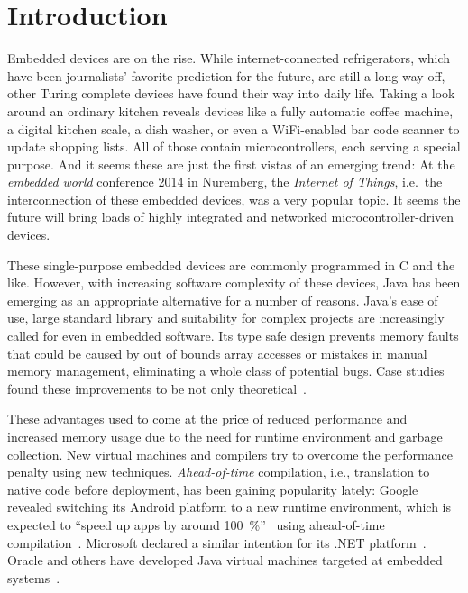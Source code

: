 
\chapter{Introduction}
	\label{chapter:intro}
	Embedded devices are on the rise. While internet-connected refrigerators, which have been journalists' favorite
	prediction for the future, are still a long way off, other Turing complete devices have found their way into daily
	life. Taking a look around an ordinary kitchen reveals devices like a fully automatic coffee machine, a digital
	kitchen scale, a dish washer, or even a WiFi-enabled bar code scanner to update shopping lists. All of those contain
	microcontrollers, each serving a special purpose. And it seems these are just the first vistas of an emerging trend:
	At the \emph{embedded world} conference 2014 in Nuremberg, the \emph{Internet of Things}, i.e.\ the interconnection of
	these embedded devices, was a very popular topic. It seems the future will bring loads of highly integrated and
	networked microcontroller-driven devices.


	These single-purpose embedded devices are commonly programmed in C and the like. However, with increasing software
	complexity of these devices, Java has been emerging as an appropriate alternative for a number of reasons. Java's ease
	of use, large standard library and suitability for complex projects are increasingly called for even in embedded
	software. Its type safe design prevents memory faults that could be caused by out of bounds array accesses or mistakes
	in manual memory management, eliminating a whole class of potential bugs. Case studies found these improvements to be
	not only theoretical~\cite{phipps:99:spe}.

	These advantages used to come at the price of reduced performance and increased memory usage due to the need for
	runtime environment and garbage collection. New virtual machines and compilers try to overcome the performance penalty
	using new techniques. \emph{Ahead-of-time} compilation, i.e., translation to native code before deployment, has been
	gaining popularity lately: Google revealed switching its Android platform to a new runtime environment, which is
	expected to \enquote{speed up apps by around 100~\%}~\cite{anthony:13:android-art} using ahead-of-time
	compilation~\cite{lindner:14:android-art}. Microsoft declared a similar intention for its .NET
	platform~\cite{lardinois:14:dotnet-aot}. Oracle and others have developed Java virtual machines targeted at embedded
	systems~\cite{merritt:13:java-for-IoT, maxfield:12:IS2T-JVM}.

